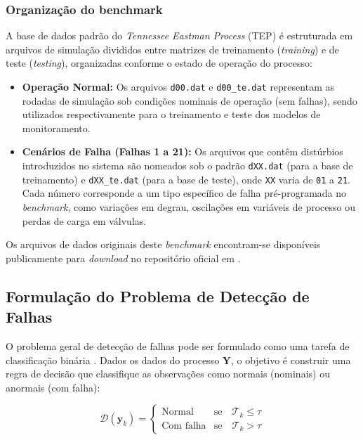 \documentclass[journal]{IEEEtran}
\begin{document}
\subsubsection{Organização do benchmark}

A base de dados padrão do \textit{Tennessee Eastman Process} (TEP) é estruturada em arquivos de simulação divididos entre matrizes de treinamento (\textit{training}) e de teste (\textit{testing}), organizadas conforme o estado de operação do processo:

\begin{itemize}
    \item \textbf{Operação Normal:} Os arquivos \texttt{d00.dat} e \texttt{d00\_te.dat} representam as rodadas de simulação sob condições nominais de operação (sem falhas), sendo utilizados respectivamente para o treinamento e teste dos modelos de monitoramento.
    \item \textbf{Cenários de Falha (Falhas 1 a 21):} Os arquivos que contêm distúrbios introduzidos no sistema são nomeados sob o padrão \texttt{dXX.dat} (para a base de treinamento) e \texttt{dXX\_te.dat} (para a base de teste), onde \texttt{XX} varia de \texttt{01} a \texttt{21}. Cada número corresponde a um tipo específico de falha pré-programada no \textit{benchmark}, como variações em degrau, oscilações em variáveis de processo ou perdas de carga em válvulas.
\end{itemize}

Os arquivos de dados originais deste \textit{benchmark} encontram-se disponíveis publicamente para \textit{download} no repositório oficial em \cite{te_process_dataport}.

\subsection{Formulação do Problema de Detecção de Falhas}
\label{subsec:fault_detection}

O problema geral de detecção de falhas pode ser formulado como uma tarefa de classificação binária \cite{venkatasubramanian2003}. Dados os dados do processo $\mathbf{Y}$, o objetivo é construir uma regra de decisão que classifique as observações como normais (nominais) ou anormais (com falha):

\begin{equation}
\mathcal{D}(\mathbf{y}_k) = \begin{cases} 
\text{Normal} & \text{se} \quad \mathcal{T}_k \leq \tau \\
\text{Com falha} & \text{se} \quad \mathcal{T}_k > \tau
\end{cases}
\label{eq:decision_rule}
\end{equation}
\end{document}
